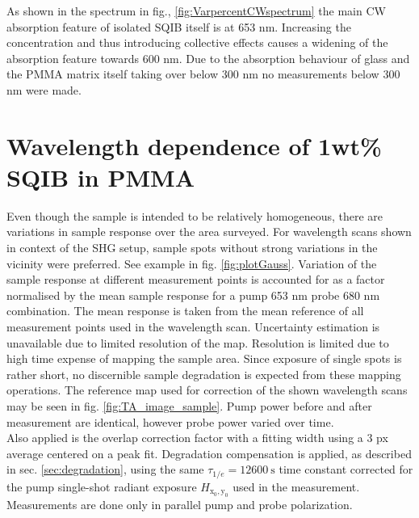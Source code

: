 \documentclass[twoside,openright,listof=numbered]{scrreprt}
\def\radiantExp{\ensuremath{H_\mathrm{x_0,y_0}}}
\begin{document}
As shown in the spectrum in fig., \ref{fig:VarpercentCWspectrum} the main CW absorption feature of isolated SQIB itself is at 653 nm. Increasing the concentration and thus introducing collective effects causes a widening of the absorption feature towards 600 nm. Due to the absorption behaviour of glass and the PMMA matrix itself taking over below 300 nm no measurements below 300 nm were made.\\

\section{Wavelength dependence of 1wt\% SQIB in PMMA}


Even though the sample is intended to be relatively homogeneous, there are variations in sample response over the area surveyed. For wavelength scans shown in context of the SHG setup, sample spots without strong variations in the vicinity were preferred. See example in fig. \ref{fig:plotGauss}. Variation of the sample response at different measurement points is accounted for as a factor normalised by the mean sample response for a pump 653 nm probe 680 nm combination. The mean response is taken from the mean reference of all measurement points used in the wavelength scan. Uncertainty estimation is unavailable due to limited resolution of the map. Resolution is limited due to high time expense of mapping the sample area. Since exposure of single spots is rather short, no discernible sample degradation is expected from these mapping operations. The reference map used for correction of the shown wavelength scans may be seen in fig. \ref{fig:TA_image_sample}. Pump power before and after measurement are identical, however probe power varied over time.\\
Also applied is the overlap correction factor with a fitting width using a 3 px average centered on a peak fit. Degradation compensation is applied, as described in sec. \ref{sec:degradation}, using the same $\tau_{1/e} = \SI{12600}{\second}$ time constant corrected for the pump single-shot radiant exposure $\radiantExp$ used in the measurement.
Measurements are done only in parallel pump and probe polarization.\\
\end{document}
